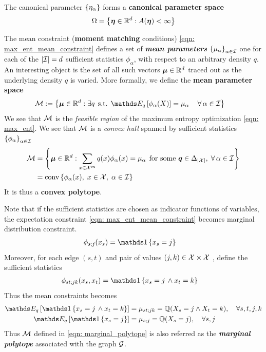 \documentclass[11pt]{article}
\begin{document}
The canonical parameter $\left\{\eta_{\alpha}\right\}$ forms a \textbf{canonical parameter space}
\begin{align}
\Omega = \left\{\boldsymbol{\eta} \in {\mathbb R}^{d}: A(\boldsymbol{\eta}) < \infty\right\} \label{eqn: canonical_space}
\end{align}

The mean constraint (\textbf{moment matching} conditions) \eqref{eqn: max_ent_mean_constraint} defines a set of \textbf{\emph{mean parameters}} $\left\{ \mu_{\alpha}\right\}_{\alpha \in {\mathcal I}}$  one for
each of the $|{\mathcal I}| = d$ sufficient statistics $\phi_{\alpha}$, with respect to an arbitrary density $q$. An interesting object is the set of all such vectors $\boldsymbol{\mu} \in {\mathbb R}^d$
traced out as the underlying density $q$ is varied. More formally, we define the \textbf{mean parameter space}
\begin{align}
\cM &:= \set{\mb{\mu} \in \bR^d: \exists q\,\; \text{s.t. } \E{q}{\phi_{\alpha}(X)} = \mu_{\alpha}\,\quad  \forall\, \alpha \in \cI}  \label{eqn: marginal_polytope}
\end{align} We see that ${\mathcal M}$ is the \emph{feasible region} of the maximum entropy optimization \eqref{eqn: max_ent}. We see that ${\mathcal M}$ is a \emph{convex hull} spanned by sufficient statistics $\left\{\phi_{\alpha}\right\}_{\alpha \in {\mathcal I}}$
\begin{align*}
{\mathcal M}&=  \left\{\boldsymbol{\mu} \in {\mathbb R}^d: \sum_{x\in {\mathcal X}^{m}}q(x)\phi_{\alpha}(x) = \mu_{\alpha}\,\; \text{for some }\boldsymbol{q} \in \Delta_{|{\mathcal X}|},\;  \forall\, \alpha \in {\mathcal I}\right\} \\
&= \text{conv}\left\{\phi_{\alpha}(x),\; x\in {\mathcal X}, \;\alpha \in {\mathcal I}\right\}
\end{align*} It is thus a \textbf{convex polytope}.

Note that if the sufficient statistics are chosen as indicator functions of variables, the expectation constraint \eqref{eqn: max_ent_mean_constraint} becomes marginal distribution constraint. 
\begin{align*}
\phi_{s;j}(x_s) &= \ind{x_s = j}  %
\end{align*} 
Moreover, for each edge $(s,t)$ and pair of values $(j,k) \in {\mathcal X} \times {\mathcal X}$ , define the sufficient statistics
\begin{align*}
\phi_{st;jk}(x_s, x_t) &= \ind{x_s = j \, \land x_{t} = k} %
\end{align*}
Thus the mean constraints becomes
\begin{align*}
\E{q}{ \ind{x_s = j \, \land x_{t} = k}} &= \mu_{st;jk} = \bQ(X_s = j \land X_t = k), \quad \forall s,t, j, k \\
\E{q}{  \ind{x_s = j} } &= \mu_{s;j} = \bQ(X_s = j ),  \quad \forall s, j
\end{align*}
Thus ${\mathcal M}$ defined in \eqref{eqn: marginal_polytope} is also referred as the \textbf{\emph{marginal polytope}} associated with the graph ${\mathcal G}$. 
\end{document}
